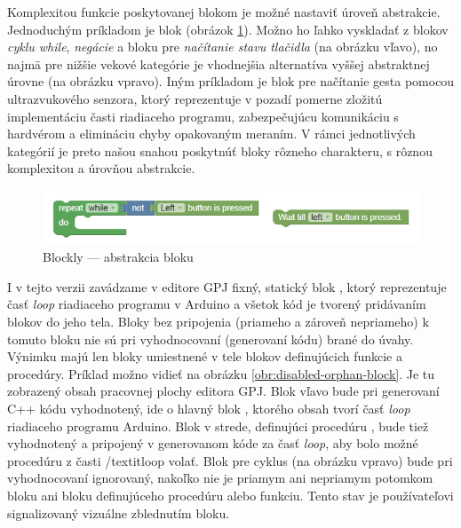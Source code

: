 Komplexitou funkcie poskytovanej blokom je možné nastaviť úroveň abstrakcie. Jednoduchým príkladom je blok  (obrázok \ref{obr:wait-till-couch}). Možno ho ľahko vyskladať z blokov \textit{cyklu while}, \textit{negácie} a bloku pre \textit{načítanie stavu tlačidla} (na obrázku vľavo), no najmä pre nižšie vekové kategórie je vhodnejšia alternatíva vyššej abstraktnej úrovne (na obrázku vpravo). Iným príkladom je blok pre načítanie gesta pomocou ultrazvukového senzora, ktorý reprezentuje v pozadí pomerne zložitú implementáciu časti riadiaceho programu, zabezpečujúcu komunikáciu s hardvérom a elimináciu chyby opakovaným meraním. V rámci jednotlivých kategórií je preto našou snahou poskytnúť bloky rôzneho charakteru, s rôznou komplexitou a úrovňou abstrakcie.

\begin{figure}
\centerline{\includegraphics[width=1\textwidth]{images/wait-till-couch}}
\caption[Blockly --- abstrakcia bloku ]{Blockly --- abstrakcia bloku }
\label{obr:wait-till-couch}
\end{figure}

I v tejto verzii zavádzame v editore GPJ fixný, statický blok , ktorý reprezentuje časť \textit{loop} riadiaceho programu v Arduino a všetok kód je tvorený pridávaním blokov do jeho tela. Bloky bez pripojenia (priameho a zároveň nepriameho) k tomuto bloku nie sú pri vyhodnocovaní (generovaní kódu) brané do úvahy. Výnimku majú len bloky umiestnené v tele blokov definujúcich funkcie a procedúry. Príklad možno vidieť na obrázku \ref{obr:disabled-orphan-block}. Je tu zobrazený obsah pracovnej plochy editora GPJ. Blok vľavo bude pri generovaní C++ kódu vyhodnotený, ide o hlavný blok , ktorého obsah tvorí časť \textit{loop} riadiaceho programu Arduino. Blok v strede, definujúci procedúru , bude tiež vyhodnotený a pripojený v generovanom kóde za časť \textit{loop}, aby bolo možné procedúru z časti /textit{loop} volať. Blok pre cyklus (na obrázku vpravo) bude pri vyhodnocovaní ignorovaný, nakoľko nie je priamym ani nepriamym potomkom bloku  ani bloku definujúceho procedúru alebo funkciu. Tento stav je používateľovi signalizovaný vizuálne zblednutím bloku.

